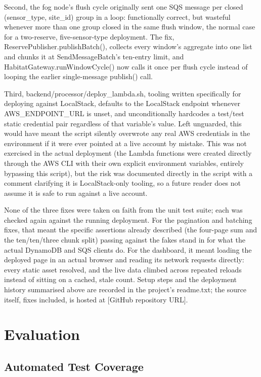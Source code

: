 \documentclass[conference,a4paper]{IEEEtran}
\begin{document}
Second, the fog node's flush cycle originally sent one SQS message per closed (sensor\_type, site\_id) group in a loop: functionally correct, but wasteful whenever more than one group closed in the same flush window, the normal case for a two-reserve, five-sensor-type deployment. The fix, ReservePublisher.publishBatch(), collects every window's aggregate into one list and chunks it at SendMessageBatch's ten-entry limit, and HabitatGateway.runWindowCycle() now calls it once per flush cycle instead of looping the earlier single-message publish() call.

Third, backend/processor/deploy\_lambda.sh, tooling written specifically for deploying against LocalStack, defaults to the LocalStack endpoint whenever AWS\_ENDPOINT\_URL is unset, and unconditionally hardcodes a test/test static credential pair regardless of that variable's value. Left unguarded, this would have meant the script silently overwrote any real AWS credentials in the environment if it were ever pointed at a live account by mistake. This was not exercised in the actual deployment (the Lambda functions were created directly through the AWS CLI with their own explicit environment variables, entirely bypassing this script), but the risk was documented directly in the script with a comment clarifying it is LocalStack-only tooling, so a future reader does not assume it is safe to run against a live account.

None of the three fixes were taken on faith from the unit test suite; each was checked again against the running deployment. For the pagination and batching fixes, that meant the specific assertions already described (the four-page sum and the ten/ten/three chunk split) passing against the fakes stand in for what the actual DynamoDB and SQS clients do. For the dashboard, it meant loading the deployed page in an actual browser and reading its network requests directly: every static asset resolved, and the live data climbed across repeated reloads instead of sitting on a cached, stale count. Setup steps and the deployment history summarised above are recorded in the project's readme.txt; the source itself, fixes included, is hosted at [GitHub repository URL].

\section{Evaluation}

\subsection{Automated Test Coverage}
\end{document}
